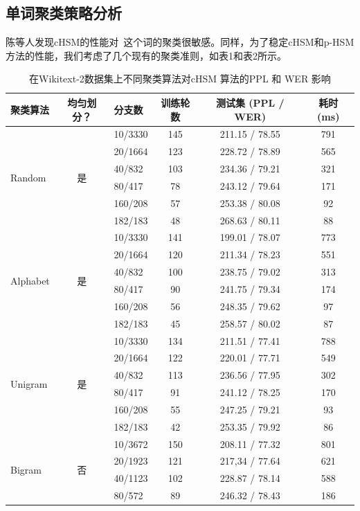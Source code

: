 \subsection{单词聚类策略分析}
陈等人发现cHSM的性能对~这个词的聚类很敏感。同样，为了稳定cHSM和p-HSM方法的性能，我们考虑了几个现有的聚类准则，如表1和表2所示。
\begin{table}[!t]
  \centering
  \caption{在Wikitext-2数据集上不同聚类算法对cHSM 算法的PPL 和 WER 影响\label{table:clustering}}
  \begin{tabular}{lclccc} \toprule
聚类算法 & 均匀划分？&分支数& 训练轮数& 测试集 (PPL / WER)&耗时 (ms)\\ \midrule
  \multirow{6}{*}{Random}  &\multirow{6}{*}{是}&10/3330&145&211.15 / 78.55 &791\\
    &&20/1664&123&228.72 / 78.89&565\\
    &&40/832&103&234.36 / 79.21&321\\
    &&80/417&78&243.12 / 79.64&171\\
    &&160/208 &57&253.38 / 80.08&92\\
    &&182/183&48&268.63 / 80.11&88\\
  \midrule
  \multirow{6}{*}{Alphabet}  &\multirow{6}{*}{是}&10/3330 &141&199.01 / 78.07 &773\\
    &&20/1664 &120&211.34 / 78.23&551\\
    &&40/832 &100&238.75 / 79.02&313\\
    &&80/417 &90&241.75 / 79.34&174\\
    &&160/208 &56&248.35 / 79.62&97\\
    &&182/183&45&258.57 / 80.02&87\\
  \midrule
  \multirow{6}{*}{Unigram}   &\multirow{6}{*}{是} &10/3330&134&211.51 / 77.41 &788\\
    & &20/1664&122&220.01 / 77.71&549\\
    & &40/832&113&236.56 / 77.95&302\\
    & &80/417&91& 241.12 / 78.25&170\\
    & &160/208&55&247.25 / 79.21&93\\
    & &182/183&42&253.35 / 79.92&86\\
  \midrule
  \multirow{5}{*}{Bigram}   &\multirow{5}{*}{否}&10/3672&150&208.11 / 77.32&801\\
     &&20/1923&121&217,34 / 77.64&621\\
     &&40/1123&102&228.87 / 78.14&588\\
     &&80/572&89&246.32 / 78.43&186\\

\end{tabular}
\end{table}
